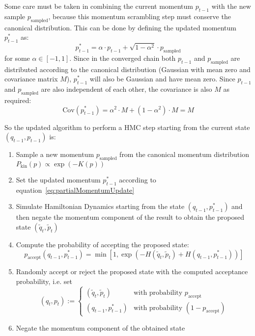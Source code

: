 \documentclass[12pt]{scrartcl}
\newcommand{\Cov}{\mathrm{Cov}}
\begin{document}
Some care must be taken in combining the current momentum $p_{t-1}$ with the new sample $p_\textrm{sampled}$, because this momentum scrambling step must conserve the canonical distribution. This can be done by defining the updated momentum $p^*_{t-1}$ as:
\begin{equation} \label{eq:partialMomentumUpdate}
p^*_{t-1} = \alpha \cdot p_{t-1} + \sqrt{1 - \alpha ^2} \cdot p_\textrm{sampled}
\end{equation}
for some $\alpha \in [-1, 1]$. Since in the converged chain both $p_{t-1}$ and $p_\textrm{sampled}$ are distributed according to the canonical distribution (Gaussian with mean zero and covariance matrix $M$), $p^*_{t-1}$ will also be Gaussian and have mean zero. Since $p_{t-1}$ and $p_\textrm{sampled}$ are also independent of each other, the covariance is also $M$ as required:
\begin{equation}
\Cov(p^*_{t-1}) = \alpha^2 \cdot M + (1 - \alpha ^2) \cdot M = M
\end{equation}

So the updated algorithm to perform a HMC step starting from the current state $(q_{t-1}, p_{t-1})$ is: \label{sec:FullHMCAlgorithm}
\begin{enumerate}
\item Sample a new momentum $p_\textrm{sampled}$ from the canonical momentum distribution $P_\textrm{kin}(p) \propto \exp{(-K(p))}$
\item Set the updated momentum $p^*_{t-1}$ according to equation~\eqref{eq:partialMomentumUpdate}
\item Simulate Hamiltonian Dynamics starting from the state $(q_{t-1}, p^*_{t-1})$ and then negate the momentum component of the result to obtain the proposed state $(\tilde{q}_t, \tilde{p}_t)$
\item Compute the probability of accepting the proposed state:
\begin{equation} \label{eq:AcceptanceProbability}
p_{\textrm{accept}}(q_{t-1}, p^*_{t-1}) = \min[1, \exp(-H(\tilde{q}_t, \tilde{p}_t) + H(q_{t-1}, p^*_{t-1}))]
\end{equation}
\item Randomly accept or reject the proposed state with the computed acceptance probability, i.e. set
\begin{equation} \label{eq:StateAfterAcceptReject}
(q_t, p_t) := \begin{cases} (\tilde{q}_t, \tilde{p}_t) & \textrm{with probability } p_{\textrm{accept}} \\ 
											(q_{t-1}, p^*_{t-1}) 			& \textrm{with probability } (1 - p_{\textrm{accept}})
					  \end{cases}
\end{equation}
\item Negate the momentum component of the obtained state
\end{enumerate} %
\end{document}
